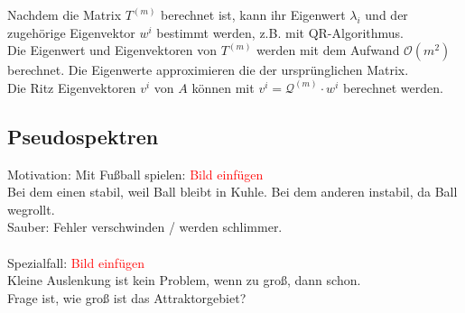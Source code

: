 
Nachdem die Matrix $T^{(m)}$ berechnet ist, kann ihr Eigenwert $\lambda_i$ und der zugehörige Eigenvektor $w^{i}$
bestimmt werden, z.B. mit QR-Algorithmus. \\
Die Eigenwert und Eigenvektoren von $T^{(m)}$ werden mit dem Aufwand $\mathcal{O}(m^2)$ berechnet. Die Eigenwerte 
approximieren die der ursprünglichen Matrix. \\
Die Ritz Eigenvektoren $v^i$ von $A$ können mit $v^i=\mathcal{Q}^{(m)}\cdot w^i$ berechnet werden.

\subsection{Pseudospektren}
Motivation:
Mit Fußball spielen: \textcolor{red}{Bild einfügen} \\
Bei dem einen stabil, weil Ball bleibt in Kuhle. Bei dem anderen instabil, da Ball wegrollt.
\\
Sauber: Fehler verschwinden / werden schlimmer. \\ \\
Spezialfall: \textcolor{red}{Bild einfügen} \\
Kleine Auslenkung ist kein Problem, wenn zu groß, dann schon. \\
Frage ist, wie groß ist das Attraktorgebiet? \\ \\ \\

